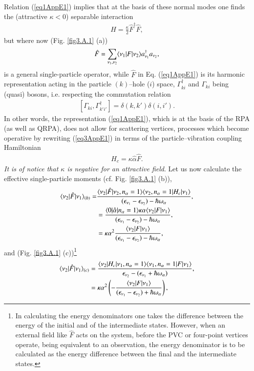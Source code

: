 Relation (\ref{eq1AppE1}) implies that at the basis of these normal modes one finds the (attractive $\kappa<0$) separable interaction 
\begin{align}\label{eq3AppE1}
H=\frac{\kappa}{2}\hat F^\dagger\hat F,
\end{align}
but where now (Fig. \ref{fig3.A.1} (a))
\begin{align}
\hat F=\sum_{\nu_1,\nu_2} \langle {\nu_1|F|\nu_2} \rangle a^\dagger_{\nu_1}a_{\nu_2},
\end{align}
is a general single-particle operator, while $\hat F$ in  Eq. (\ref{eq1AppE1}) is its harmonic representation acting in the particle $(k)$--hole ($i$) space, $\Gamma^\dagger_{ki}$ and $\Gamma_{ki}$ being (quasi) bosons, i.e. respecting the commutation relation 
\begin{align}
\left[\Gamma_{ki},\Gamma^\dagger_{k'i'}\right]=\delta(k,k')\delta(i,i').
\end{align}
In other words, the representation (\ref{eq1AppE1}), which is at the basis of the RPA (as well as QRPA), does not allow for scattering vertices, processes which become operative by rewriting (\ref{eq3AppE1}) in terms of the particle--vibration coupling Hamiltonian
\begin{align}\label{eq3AppE4}
H_c=\kappa\hat \alpha\hat F.
\end{align}
\emph{It is of notice that $\kappa$ is negative for an attractive field}. Let us now calculate the effective single-particle moments (cf. Fig. \ref{fig3.A.1} (b)),
\begin{align}
\nonumber \langle {\nu_2|\hat F|\nu_1} \rangle_{(b)}=&\frac{\langle {\nu_2|\hat F|\nu_2,n_\alpha=1} \rangle\langle {\nu_2,n_\alpha=1|H_c|\nu_1} \rangle}{(\epsilon_{\nu_1}-\epsilon_{\nu_2})-\hbar\omega_\alpha},\\
\nonumber &=\frac{\langle {0|\hat \alpha|n_\alpha=1} \rangle\kappa\alpha \langle {\nu_2|F|\nu_1} \rangle}{(\epsilon_{\nu_1}-\epsilon_{\nu_2})-\hbar\omega_\alpha},\\
&=\kappa\alpha^2\frac{ \langle {\nu_2|F|\nu_1} \rangle}{(\epsilon_{\nu_1}-\epsilon_{\nu_2})-\hbar\omega_\alpha},
\end{align}
and (Fig. \ref{fig3.A.1} (c))\footnote{In calculating the energy denominators one takes the difference between the energy of the initial and of the intermediate states. However, when an external field like $\hat F$ acts on the system, before the PVC or four-point vertices operate, being equivalent to an observation, the energy denominator is to be calculated as the energy difference between the final and the intermediate states. }
\begin{align}\label{eq8App1E}
\nonumber \langle {\nu_2|\hat F|\nu_1} \rangle_{(c)}&=\frac{\langle {\nu_2|H_c|\nu_1,n_\alpha=1} \rangle\langle {\nu_1,n_\alpha=1| F|\nu_1} \rangle}{\epsilon_{\nu_2}-(\epsilon_{\nu_1}+\hbar\omega_\alpha)},\\
&=\kappa\alpha^2\left(-\frac{\langle {\nu_2|F|\nu_1} \rangle}{(\epsilon_{\nu_1}-\epsilon_{\nu_2})+\hbar\omega_\alpha}\right),
\end{align}
